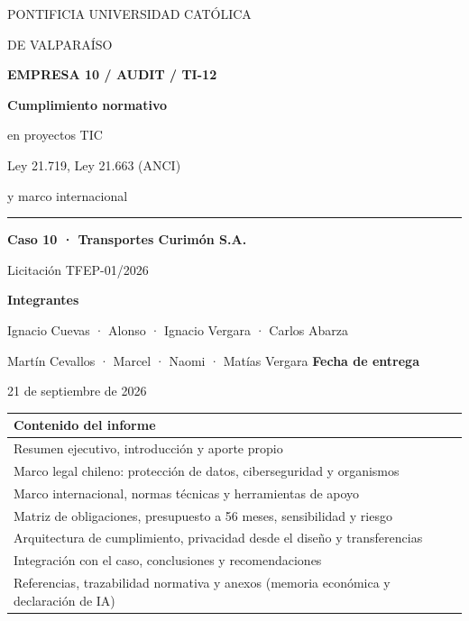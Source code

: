 \documentclass[10pt,a4paper]{article}
\begin{document}
\thispagestyle{empty}
{\sffamily\color{navy}\large PONTIFICIA UNIVERSIDAD CATÓLICA\par DE VALPARAÍSO\par}
\vspace{5mm}{\sffamily Escuela de Informática\par ICI-5444 · Taller de Formulación de Proyectos Informáticos}
\vspace{23mm}
{\sffamily\color{teal}\bfseries\large EMPRESA 10 / AUDIT / TI-12\par}
\vspace{6mm}
{\sffamily\color{navy}\bfseries\fontsize{29}{34}\selectfont Cumplimiento normativo\par en proyectos TIC\par}
\vspace{7mm}
{\sffamily\Large Ley 21.719, Ley 21.663 (ANCI)\par y marco internacional\par}
\vspace{10mm}\textcolor{teal}{\rule{\linewidth}{1.3pt}}
\vspace{6mm}
{\large\textbf{Caso 10 · Transportes Curimón S.A.}\par Licitación TFEP-01/2026\par}
\vspace{10mm}
\textbf{Integrantes}\par
Ignacio Cuevas · Alonso · Ignacio Vergara · Carlos Abarza\par
Martín Cevallos · Marcel · Naomi · Matías Vergara
\vspace{7mm}\textbf{Fecha de entrega}\par 21 de septiembre de 2026
\vfill
\begin{tabularx}{\linewidth}{@{}X@{}}
\textbf{Contenido del informe}\\\midrule
Resumen ejecutivo, introducción y aporte propio\\
Marco legal chileno: protección de datos, ciberseguridad y organismos\\
Marco internacional, normas técnicas y herramientas de apoyo\\
Matriz de obligaciones, presupuesto a 56 meses, sensibilidad y riesgo\\
Arquitectura de cumplimiento, privacidad desde el diseño y transferencias\\
Integración con el caso, conclusiones y recomendaciones\\
Referencias, trazabilidad normativa y anexos (memoria económica y declaración de IA)\\
\end{tabularx}
\end{document}

